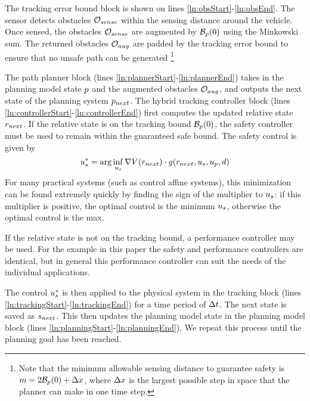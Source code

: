 The tracking error bound block is shown on lines \ref{ln:obsStart}-\ref{ln:obsEnd}. The sensor detects obstacles $\mathcal{O}_{sense}$ within the sensing distance around the vehicle. Once sensed, the obstacles $\mathcal{O}_{sense}$ are augmented by $\mathcal B_p(0)$ using the Minkowski sum. The returned obstacles $\mathcal{O}_{aug}$ are padded by the tracking error bound to ensure that no unsafe path can be generated \footnote{Note that the minimum allowable sensing distance to guarantee safety is $m = 2\mathcal B_p(0) + \Delta x$, where $\Delta x$ is the largest possible step in space that the planner can make in one time step.}


 The path planner block (lines \ref{ln:plannerStart}-\ref{ln:plannerEnd}) takes in the planning model state $p$ and the augmented obstacles $\mathcal{O}_{aug}$, and outputs the next state of the planning system $p_{next}$. The hybrid tracking controller block (lines \ref{ln:controllerStart}-\ref{ln:controllerEnd}) first computes the updated relative state $r_{next}$. If the relative state is on the tracking bound $\mathcal B_p(0)$, the safety controller must be used to remain within the guaranteed safe bound. The safety control is given by
\begin{equation}
	u_s^* = \arg\inf_{u_s} \nabla V(r_{next}) \cdot g(r_{next},u_s,u_p,d)
\end{equation}
For many practical systems (such as control affine systems), this minimization can be found extremely quickly by finding the sign of the multiplier to $u_s$: if this multiplier is positive, the optimal control is the minimum $u_s$, otherwise the optimal control is the max.

If the relative state is not on the tracking bound, a performance controller may be used. For the example in this paper the safety and performance controllers are identical, but in general this performance controller can suit the needs of the individual applications.

The control $u_s^*$ is then applied to the physical system in the tracking block (lines \ref{ln:trackingStart}-\ref{ln:trackingEnd}) for a time period of $\Delta t$. The next state is saved as $s_{next}$. This then updates the planning model state in the planning model block (lines \ref{ln:planningStart}-\ref{ln:planningEnd}). We repeat this process until the planning goal has been reached.